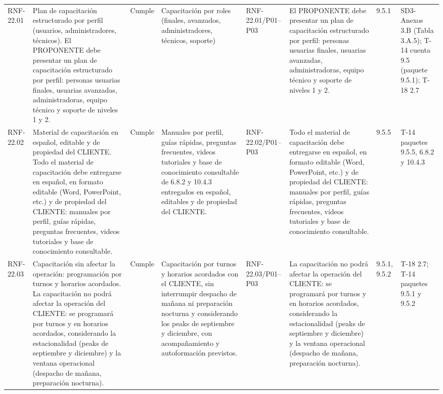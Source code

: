 \documentclass[oficio,firma,final]{lafrox}
\begin{document}
\begin{landscape}
{\begin{longtable}{@{}F{0.054} F{0.173} F{0.061} F{0.191} F{0.106} F{0.180} F{0.067} F{0.168}@{}}
  RNF-22.01 & Plan de capacitación estructurado por perfil (usuarios, administradores, técnicos). El PROPONENTE debe presentar un plan de capacitación estructurado por perfil: personas usuarias finales, usuarias avanzadas, administradoras, equipo técnico y soporte de niveles 1 y 2. & Cumple & Capacitación por roles (finales, avanzados, administradores, técnicos, soporte) & RNF-22.01/\allowbreak{}P01--\allowbreak{}P03 & El PROPONENTE debe presentar un plan de capacitación estructurado por perfil: personas usuarias finales, usuarias avanzadas, administradoras, equipo técnico y soporte de niveles 1 y 2. & 9.5.1 & SD3-Anexos 3.B (Tabla 3.A.5); T-14 cuenta 9.5 (paquete 9.5.1); T-18 2.7  \\
  RNF-22.02 & Material de capacitación en español, editable y de propiedad del CLIENTE. Todo el material de capacitación debe entregarse en español, en formato editable (Word, PowerPoint, etc.) y de propiedad del CLIENTE: manuales por perfil, guías rápidas, preguntas frecuentes, videos tutoriales y base de conocimiento consultable. & Cumple & Manuales por perfil, guías rápidas, preguntas frecuentes, videos tutoriales y base de conocimiento consultable de 6.8.2 y 10.4.3 entregados en español, editables y de propiedad del CLIENTE. & RNF-22.02/\allowbreak{}P01--\allowbreak{}P03 & Todo el material de capacitación debe entregarse en español, en formato editable (Word, PowerPoint, etc.) y de propiedad del CLIENTE: manuales por perfil, guías rápidas, preguntas frecuentes, videos tutoriales y base de conocimiento consultable. & 9.5.5 & T-14 paquetes 9.5.5, 6.8.2 y 10.4.3  \\
  RNF-22.03 & Capacitación sin afectar la operación: programación por turnos y horarios acordados. La capacitación no podrá afectar la operación del CLIENTE: se programará por turnos y en horarios acordados, considerando la estacionalidad (peaks de septiembre y diciembre) y la ventana operacional (despacho de mañana, preparación nocturna). & Cumple & Capacitación por turnos y horarios acordados con el CLIENTE, sin interrumpir despacho de mañana ni preparación nocturna y considerando los peaks de septiembre y diciembre, con acompañamiento y autoformación previstos. & RNF-22.03/\allowbreak{}P01--\allowbreak{}P03 & La capacitación no podrá afectar la operación del CLIENTE: se programará por turnos y en horarios acordados, considerando la estacionalidad (peaks de septiembre y diciembre) y la ventana operacional (despacho de mañana, preparación nocturna). & 9.5.1, 9.5.2 & T-18 2.7; T-14 paquetes 9.5.1 y 9.5.2  \\

\end{longtable}}
\end{landscape}
\end{document}
